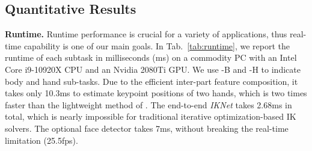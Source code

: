 \documentclass[final]{cvpr}
\begin{document}
 \subsection{Quantitative Results}
\noindent \textbf{Runtime.}
Runtime performance is crucial for a variety of applications, thus real-time capability is one of our main goals.
In Tab.~\ref{tab:runtime}, we report the runtime of each subtask in milliseconds (ms) on a commodity PC with an Intel Core i9-10920X CPU and an Nvidia 2080Ti GPU.
We use -B and -H to indicate body and hand sub-tasks.
Due to the efficient inter-part feature composition, it takes only 10.3ms to estimate keypoint positions of two hands, which is two times faster than the lightweight method of \cite{zhou2020monocular}.
The end-to-end \textit{IKNet} takes 2.68ms in total, which is nearly impossible for traditional iterative optimization-based IK solvers.
The optional face detector \cite{king2009dlib} takes 7ms, without breaking the real-time limitation (25.5fps).
\begin{table}[t]
  \centering
  \begin{subtable}[c]{\linewidth}
  \centering
  \end{subtable}
  \begin{subtable}[c]{\linewidth}
  \centering
  \end{subtable}
  \caption{
Runtime analysis in milliseconds and frames per second (FPS).
Top: runtime of each subtask in our method.
Bottom: comparison with previous works.
}
  \label{tab:runtime}
\end{table}
\end{document}

